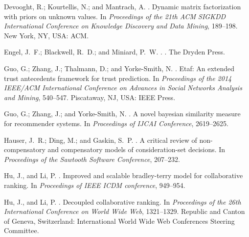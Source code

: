 \documentclass[letterpaper]{article} %
\begin{document}
\begin{thebibliography}{}

Devooght, R.; Kourtellis, N.; and Mantrach, A.
.
\newblock Dynamic matrix factorization with priors on unknown values.
\newblock In {\em Proceedings of the 21th ACM SIGKDD International Conference
  on Knowledge Discovery and Data Mining},  189--198.
\newblock New York, NY, USA: ACM.

Engel, J.~F.; Blackwell, R.~D.; and Miniard, P.~W.
.
.
\newblock The Dryden Press.

Guo, G.; Zhang, J.; Thalmann, D.; and Yorke-Smith, N.
.
\newblock Etaf: An extended trust antecedents framework for trust prediction.
\newblock In {\em Proceedings of the 2014 IEEE/ACM International Conference on
  Advances in Social Networks Analysis and Mining},  540--547.
\newblock Piscataway, NJ, USA: IEEE Press.

Guo, G.; Zhang, J.; and Yorke-Smith, N.
.
\newblock A novel bayesian similarity measure for recommender systems.
\newblock In {\em Proceedings of IJCAI Conference},  2619--2625.

Hauser, J.~R.; Ding, M.; and Gaskin, S.~P.
.
\newblock A critical review of non-compensatory and compensatory models of
  consideration-set decisions.
\newblock In {\em Proceedings of the Sawtooth Software Conference},  207--232.

Hu, J., and Li, P.
.
\newblock Improved and scalable bradley-terry model for collaborative ranking.
\newblock In {\em Proceedings of IEEE ICDM conference},  949--954.

Hu, J., and Li, P.
.
\newblock Decoupled collaborative ranking.
\newblock In {\em Proceedings of the 26th International Conference on World
  Wide Web},  1321--1329.
\newblock Republic and Canton of Geneva, Switzerland: International World Wide
  Web Conferences Steering Committee.


\end{thebibliography}
\end{document}

